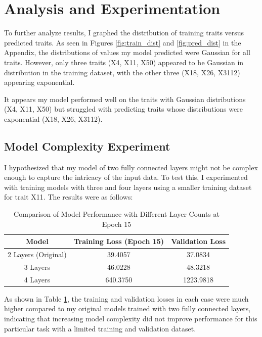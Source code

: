\documentclass{article}
\begin{document}
\section{Analysis and Experimentation}

To further analyze results, I graphed the distribution of training traits versus predicted traits. As seen in Figures \ref{fig:train_dist} and \ref{fig:pred_dist} in the Appendix, the distributions of values my model predicted were Gaussian for all traits. However, only three traits (X4, X11, X50) appeared to be Gaussian in distribution in the training dataset, with the other three (X18, X26, X3112) appearing exponential.

It appears my model performed well on the traits with Gaussian distributions (X4, X11, X50) but struggled with predicting traits whose distributions were exponential (X18, X26, X3112).

\subsection{Model Complexity Experiment}

I hypothesized that my model of two fully connected layers might not be complex enough to capture the intricacy of the input data. To test this, I experimented with training models with three and four layers using a smaller training dataset for trait X11. The results were as follows:

\begin{table}[h]
    \centering
    \begin{tabular}{|c|c|c|}
        \hline
        Model & Training Loss (Epoch 15) & Validation Loss \\
        \hline
        2 Layers (Original) & 39.4057 & 37.0834 \\
        3 Layers & 46.0228 & 48.3218 \\
        4 Layers & 640.3750 & 1223.9818 \\
        \hline
    \end{tabular}
    \caption{Comparison of Model Performance with Different Layer Counts at Epoch 15}
    \label{tab:model_comparison}
\end{table}

As shown in Table \ref{tab:model_comparison}, the training and validation losses in each case were much higher compared to my original models trained with two fully connected layers, indicating that increasing model complexity did not improve performance for this particular task with a limited training and validation dataset.
\end{document}
